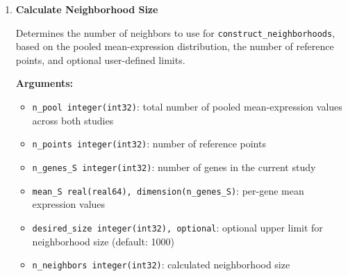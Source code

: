 \begin{enumerate}
        \textbf{Arguments:}
        \begin{itemize}
            \item \lstinline!pooled_means real(real64), dimension(pool_size)!: pooled mean-expression values
            \item \lstinline!pooled_means_perm integer(int32), dimension(pool_size)!: permutation vector that sorts \lstinline!pooled_means!
            \item \lstinline!pool_size integer(int32)!: number of pooled means (typically \lstinline!n_genes_S1 + n_genes_S2!)
            \item \lstinline!n_points integer(int32)!: number of reference points to compute
            \item \lstinline!n_pool integer(int32)!: number of included (non-NaN) pooled means
            \item \lstinline!x_star real(real64), dimension(n_points)!: mean-expression reference points
            \item \lstinline!ierr integer(int32)!: error code
        \end{itemize}

        \begin{lstlisting}[caption={Pool Means}]
call pool_means(pooled_means, pooled_means_perm, pool_size, n_points, n_pool, x_star, ierr)
        \end{lstlisting}

    \item \textbf{Calculate Neighborhood Size}

        Determines the number of neighbors to use for \lstinline!construct_neighborhoods!, based on the pooled mean-expression distribution, the number of reference points, and optional user-defined limits.

        \textbf{Arguments:}
        \begin{itemize}
            \item \lstinline!n_pool integer(int32)!: total number of pooled mean-expression values across both studies
            \item \lstinline!n_points integer(int32)!: number of reference points
            \item \lstinline!n_genes_S integer(int32)!: number of genes in the current study
            \item \lstinline!mean_S real(real64), dimension(n_genes_S)!: per-gene mean expression values
            \item \lstinline!desired_size integer(int32), optional!: optional upper limit for neighborhood size (default: 1000)
            \item \lstinline!n_neighbors integer(int32)!: calculated neighborhood size
        \end{itemize}


\end{enumerate}
